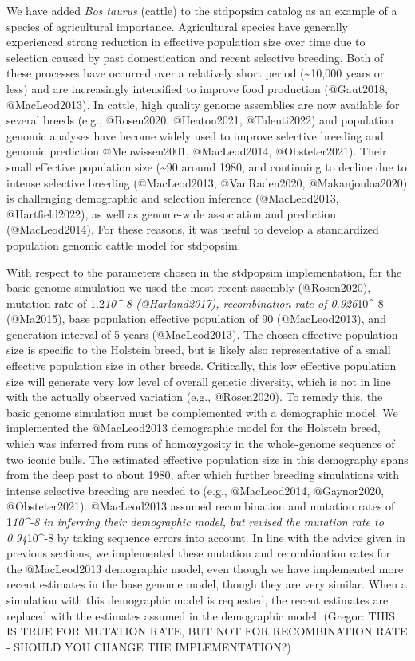 \documentclass[hidelinks]{article}
\begin{document}
We have added \emph{Bos taurus} (cattle) to the stdpopsim catalog as an
example of a species of agricultural importance. Agricultural species
have generally experienced strong reduction in effective population size
over time due to selection caused by past domestication and recent
selective breeding. Both of these processes have occurred over a
relatively short period (\textasciitilde10,000 years or less) and are
increasingly intensified to improve food production (@Gaut2018,
@MacLeod2013). In cattle, high quality genome assemblies are now
available for several breeds (e.g., @Rosen2020, @Heaton2021,
@Talenti2022) and population genomic analyses have become widely used to
improve selective breeding and genomic prediction @Meuwissen2001,
@MacLeod2014, @Obsteter2021). Their small effective population size
(\textasciitilde90 around 1980, and continuing to decline due to intense
selective breeding (@MacLeod2013, @VanRaden2020, @Makanjouloa2020) is
challenging demographic and selection inference (@MacLeod2013,
@Hartfield2022), as well as genome-wide association and prediction
(@MacLeod2014), For these reasons, it was useful to develop a
standardized population genomic cattle model for stdpopsim.

With respect to the parameters chosen in the stdpopsim implementation,
for the basic genome simulation we used the most recent assembly
(@Rosen2020), mutation rate of 1.2\emph{10\^{}-8 (@Harland2017),
recombination rate of 0.926}10\^{}-8 (@Ma2015), base population
effective population of 90 (@MacLeod2013), and generation interval of 5
years (@MacLeod2013). The chosen effective population size is specific
to the Holstein breed, but is likely also representative of a small
effective population size in other breeds. Critically, this low
effective population size will generate very low level of overall
genetic diversity, which is not in line with the actually observed
variation (e.g., @Rosen2020). To remedy this, the basic genome
simulation must be complemented with a demographic model. We implemented
the @MacLeod2013 demographic model for the Holstein breed, which was
inferred from runs of homozygosity in the whole-genome sequence of two
iconic bulls. The estimated effective population size in this demography
spans from the deep past to about 1980, after which further breeding
simulations with intense selective breeding are needed to (e.g.,
@MacLeod2014, @Gaynor2020, @Obsteter2021). @MacLeod2013 assumed
recombination and mutation rates of 1\emph{10\^{}-8 in inferring their
demographic model, but revised the mutation rate to 0.94}10\^{}-8 by
taking sequence errors into account. In line with the advice given in
previous sections, we implemented these mutation and recombination rates
for the @MacLeod2013 demographic model, even though we have implemented
more recent estimates in the base genome model, though they are very
similar. When a simulation with this demographic model is requested, the
recent estimates are replaced with the estimates assumed in the
demographic model. (Gregor: THIS IS TRUE FOR MUTATION RATE, BUT NOT FOR
RECOMBINATION RATE - SHOULD YOU CHANGE THE IMPLEMENTATION?)
\end{document}
